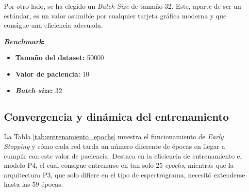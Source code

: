 Por otro lado, se ha elegido un \textit{Batch Size} de tamaño 32. Este, aparte de ser un estándar, es un valor asumible por cualquier tarjeta gráfica moderna y que consigue una eficiencia adecuada. 

\noindent \textbf{\textit{Benchmark}:}
\begin{itemize}
    \item \textbf{Tamaño del dataset: }50000
    \item \textbf{Valor de paciencia: }10 
    \item \textbf{\textit{Batch size}: }32
\end{itemize}


\subsection{Convergencia y dinámica del entrenamiento}

\begin{table}[H]
    \centering
    \caption[Resumen del rendimiento durante la fase de entrenamiento (\textit{Early Stopping} = 10)]{. Cabe destacar que los errores de los modelos que presentan funciones de pérdida diferentes no son comparables.}
    \label{tab:entrenamiento_epochs}
\end{table}

La Tabla \ref{tab:entrenamiento_epochs} muestra el funcionamiento de \textit{Early Stopping} y cómo cada red tarda un número diferente de épocas en llegar a cumplir con este valor de paciencia. Destaca en la eficiencia de entrenamiento el modelo P4, el cual consigue entrenarse en tan solo 25 \textit{epochs}, mientras que la arquitectura P3, que solo difiere en el tipo de espectrograma, necesitó extenderse hasta las 59 épocas. 

